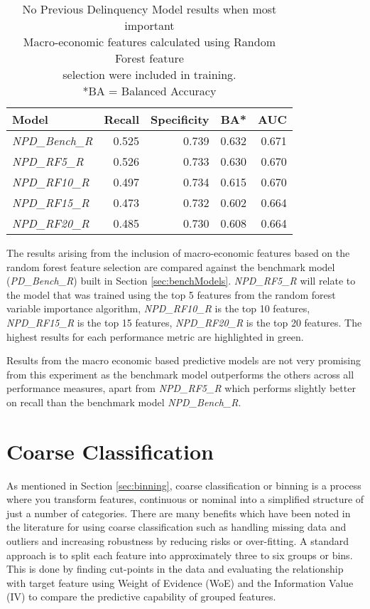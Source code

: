\begin{table}[H]
\centering
\small
		\begin{tabular}{l  r r r r}
\hline
\textbf{Model}  & \textbf{Recall} & \textbf{Specificity} & \textbf{BA*} & \textbf{AUC}  \\ \hline
\textit{NPD\_Bench\_R} & 0.525 & \cellcolor{green!25}0.739 & \cellcolor{green!25}0.632 & \cellcolor{green!25}0.671   \\ \hline
\textit{NPD\_RF5\_R}  & \cellcolor{green!25}0.526 & 0.733 & 0.630 & 0.670   \\ 
\textit{NPD\_RF10\_R} & 0.497 & 0.734 & 0.615 & 0.670 \\ 
\textit{NPD\_RF15\_R} & 0.473 & 0.732 & 0.602 & 0.664  \\
\textit{NPD\_RF20\_R} & 0.485 & 0.730 & 0.608 & 0.664  \\\hline 
		\end{tabular}

	\caption{No Previous Delinquency Model results when most important\\
		Macro-economic features calculated using Random Forest feature \\selection were included in training.
		\\ *BA = Balanced Accuracy}
	\label{table:RFNPDModelResults}
\end{table}

The results arising from the inclusion of macro-economic features based on the random forest feature selection are compared against the benchmark model (\textit{PD\_Bench\_R}) built in Section \ref{sec:benchModels}. \textit{NPD\_RF5\_R} will relate to the model that was trained using the top 5 features from the random forest variable importance algorithm, \textit{NPD\_RF10\_R} is the top 10 features, \textit{NPD\_RF15\_R} is the top 15 features, \textit{NPD\_RF20\_R} is the top 20 features. The highest results for each performance metric are highlighted in green.

Results from the macro economic based predictive models are not very promising from this experiment as the benchmark model outperforms the others across all performance measures, apart from \textit{NPD\_RF5\_R} which performs slightly better on recall than the benchmark model \textit{NPD\_Bench\_R}.



\section{Coarse Classification}
As mentioned in Section \ref{sec:binning}, coarse classification or binning is a process where you transform features, continuous or nominal into a simplified structure of just a number of categories. There are many benefits which have been noted in the literature for using coarse classification such as handling missing data and outliers and increasing robustness by reducing risks or over-fitting. A standard approach is to split each feature into approximately three to six groups or bins. This is done by finding cut-points in the data and evaluating the relationship with target feature using Weight of Evidence (WoE) and the Information Value (IV) to compare the predictive capability of grouped features.

